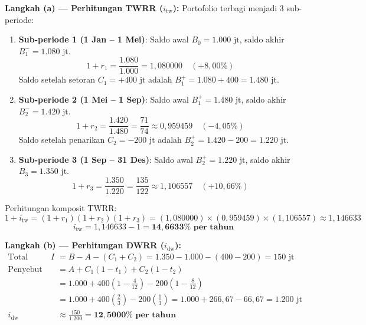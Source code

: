 \documentclass[11pt,a4paper]{article}
\begin{document}
\begin{solusibox}
\textbf{Langkah (a) --- Perhitungan TWRR ($i_{\text{tw}}$):}
Portofolio terbagi menjadi 3 sub-periode:
\begin{enumerate}[leftmargin=4mm, topsep=1pt, itemsep=1pt]
    \item \textbf{Sub-periode 1 (1 Jan -- 1 Mei)}:  
    Saldo awal $B_0 = 1.000\text{ jt}$, saldo akhir $B_1^- = 1.080\text{ jt}$.  
    $$1 + r_1 = \frac{1.080}{1.000} = 1{,}080000 \quad (+8{,}00\%)$$
    Saldo setelah setoran $C_1 = +400\text{ jt}$ adalah $B_1^+ = 1.080 + 400 = 1.480\text{ jt}$.
    
    \item \textbf{Sub-periode 2 (1 Mei -- 1 Sep)}:  
    Saldo awal $B_1^+ = 1.480\text{ jt}$, saldo akhir $B_2^- = 1.420\text{ jt}$.  
    $$1 + r_2 = \frac{1.420}{1.480} = \frac{71}{74} \approx 0{,}959459 \quad (-4{,}05\%)$$
    Saldo setelah penarikan $C_2 = -200\text{ jt}$ adalah $B_2^+ = 1.420 - 200 = 1.220\text{ jt}$.
    
    \item \textbf{Sub-periode 3 (1 Sep -- 31 Des)}:  
    Saldo awal $B_2^+ = 1.220\text{ jt}$, saldo akhir $B_3 = 1.350\text{ jt}$.  
    $$1 + r_3 = \frac{1.350}{1.220} = \frac{135}{122} \approx 1{,}106557 \quad (+10{,}66\%)$$
\end{enumerate}
Perhitungan komposit TWRR:
$$1 + i_{\text{tw}} = (1 + r_1)(1 + r_2)(1 + r_3) = (1{,}080000) \times (0{,}959459) \times (1{,}106557) \approx 1{,}146633$$
$$i_{\text{tw}} = 1{,}146633 - 1 = \mathbf{14{,}6633\% \text{ per tahun}}$$

\textbf{Langkah (b) --- Perhitungan DWRR ($i_{\text{dw}}$):}
\begin{align*}
    \text{Total Bunga Bersih } I &= B - A - (C_1 + C_2) = 1.350 - 1.000 - (400 - 200) = 150\text{ jt} \\
    \text{Penyebut Tertimbang} &= A + C_1(1 - t_1) + C_2(1 - t_2) \\
    &= 1.000 + 400\left(1 - \frac{4}{12}\right) - 200\left(1 - \frac{8}{12}\right) \\
    &= 1.000 + 400\left(\frac{2}{3}\right) - 200\left(\frac{1}{3}\right) = 1.000 + 266{,}67 - 66{,}67 = 1.200\text{ jt} \\
    i_{\text{dw}} &\approx \frac{150}{1.200} = \mathbf{12{,}5000\% \text{ per tahun}}
\end{align*}


\end{solusibox}
\end{document}
